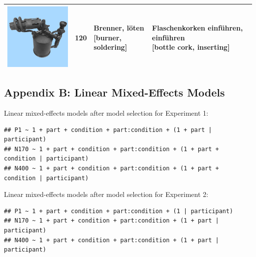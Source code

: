 \documentclass[
  english,
  doc,12pt,twoside,floatsintext]{apa7}
\begin{document}
\begin{center}
\begin{ThreePartTable}
{\begin{longtable}{llll}
\includegraphics[valign=c, scale=0.23]{../materials/unfamiliar/120.png} & 120 & \makecell[l]{Brenner, löten\\{[burner, soldering]}} & \makecell[l]{Flaschenkorken einführen, einführen\\{[bottle cork, inserting]}}\\
\bottomrule
\end{longtable}

}

\end{ThreePartTable}
\end{center}

\hypertarget{appendix-b-linear-mixed-effects-models}{%
\subsection*{Appendix B: Linear Mixed-Effects Models}\label{appendix-b-linear-mixed-effects-models}}

\noindent Linear mixed-effects models after model selection for Experiment 1:

\footnotesize

\begin{verbatim}
## P1 ~ 1 + part + condition + part:condition + (1 + part | participant)
## N170 ~ 1 + part + condition + part:condition + (1 + part + condition | participant)
## N400 ~ 1 + part + condition + part:condition + (1 + part + condition | participant)
\end{verbatim}

\normalsize

\noindent Linear mixed-effects models after model selection for Experiment 2:

\footnotesize

\begin{verbatim}
## P1 ~ 1 + part + condition + part:condition + (1 | participant)
## N170 ~ 1 + part + condition + part:condition + (1 + part | participant)
## N400 ~ 1 + part + condition + part:condition + (1 + part | participant)
\end{verbatim}
\end{document}
